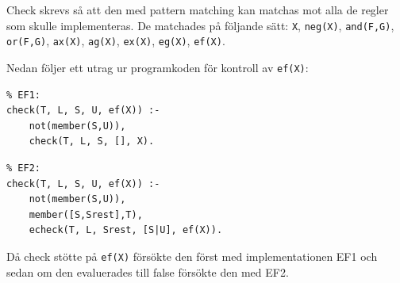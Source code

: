Check skrevs så att den med pattern matching kan matchas mot alla de regler som skulle implementeras. De matchades på följande sätt: \texttt{X}, \texttt{neg(X)}, \texttt{and(F,G)}, \texttt{or(F,G)}, \texttt{ax(X)}, \texttt{ag(X)}, \texttt{ex(X)}, \texttt{eg(X)}, \texttt{ef(X)}.

Nedan följer ett utrag ur programkoden för kontroll av \texttt{ef(X)}:

\begin{center}
\begin{minipage}{0.6\textwidth}

\begin{verbatim}
% EF1:
check(T, L, S, U, ef(X)) :-
	not(member(S,U)),
	check(T, L, S, [], X).
\end{verbatim}


\begin{verbatim}
% EF2:
check(T, L, S, U, ef(X)) :-
	not(member(S,U)),	
	member([S,Srest],T),
	echeck(T, L, Srest, [S|U], ef(X)).
\end{verbatim}


\end{minipage}
\end{center}

Då check stötte på \texttt{ef(X)} försökte den först med implementationen EF1 och sedan om den evaluerades till false försökte den med EF2.